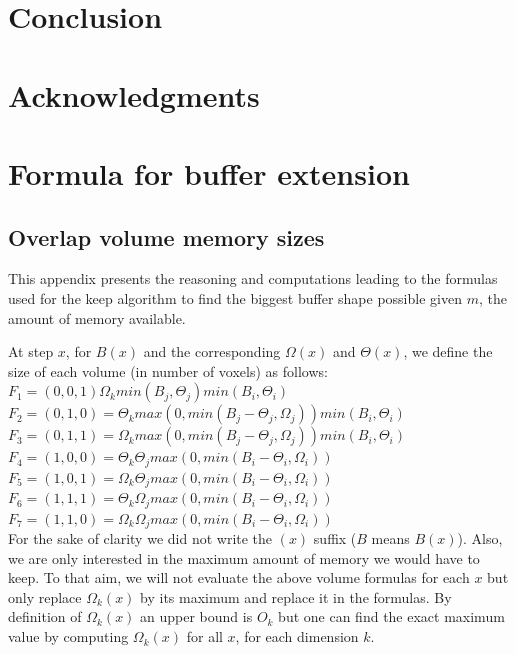 \documentclass[conference]{IEEEtran}
\begin{document}
\section*{Conclusion}

\section*{Acknowledgments}




\appendices

  \section{Formula for buffer extension}
  \label{FormulasKeep}

  \subsection{Overlap volume memory sizes}
  This appendix presents the reasoning and computations leading to the formulas used for the keep algorithm to find the biggest buffer shape possible given $m$, the amount of memory available.

  At step $x$, for $B(x)$ and the corresponding $\Omega(x)$ and $\Theta(x)$, we define the size of each volume (in number of voxels) as follows:
  \noindent $F_1 = (0,0,1) \Omega_k min(B_j, \Theta_j) min(B_i, \Theta_i)$ \\
  $F_2 = (0,1,0) = \Theta_k max(0, min(B_j - \Theta_j, \Omega_j)) min(B_i, \Theta_i)$ \\
  $F_3 = (0,1,1) = \Omega_k max(0, min(B_j - \Theta_j, \Omega_j)) min(B_i, \Theta_i)$ \\
  $F_4 = (1,0,0) = \Theta_k \Theta_j max(0, min(B_i-\Theta_i, \Omega_i))$ \\
  $F_5 = (1,0,1) = \Omega_k \Theta_j max(0, min(B_i-\Theta_i, \Omega_i))$ \\
  $F_6 = (1,1,1) = \Theta_k \Omega_j max(0, min(B_i-\Theta_i, \Omega_i))$ \\
  $F_7 = (1,1,0) = \Omega_k \Omega_j max(0, min(B_i-\Theta_i, \Omega_i))$ \\

  For the sake of clarity we did not write the $(x)$ suffix ($B$ means $B(x)$).
  Also, we are only interested in the maximum amount of memory we would have to keep.
  To that aim, we will not evaluate the above volume formulas for each $x$ but only replace $\Omega_k(x)$ by its maximum and replace it in the formulas.
  By definition of $\Omega_k(x)$ an upper bound is $O_k$ but one can find the exact maximum value by computing $\Omega_k(x)$ for all $x$, for each dimension $k$.
\end{document}
